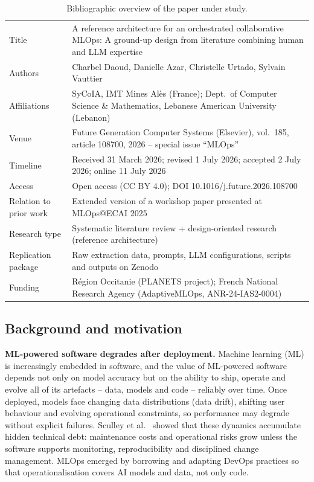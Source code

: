 \documentclass[11pt,a4paper]{article}
\begin{document}
\begin{table}[h]
\centering
\caption{Bibliographic overview of the paper under study.}
\small
\begin{tabularx}{\textwidth}{@{}L{3.2cm}X@{}}
\toprule
Title & A reference architecture for an orchestrated collaborative MLOps: A ground-up design from literature combining human and LLM expertise \\
Authors & Charbel Daoud, Danielle Azar, Christelle Urtado, Sylvain Vauttier \\
Affiliations & SyCoIA, IMT Mines Al\`es (France); Dept.\ of Computer Science \& Mathematics, Lebanese American University (Lebanon) \\
Venue & Future Generation Computer Systems (Elsevier), vol.~185, article 108700, 2026 -- special issue ``MLOps'' \\
Timeline & Received 31 March 2026; revised 1 July 2026; accepted 2 July 2026; online 11 July 2026 \\
Access & Open access (CC BY 4.0); DOI 10.1016/j.future.2026.108700 \\
Relation to prior work & Extended version of a workshop paper presented at MLOps@ECAI 2025~\cite{daoud2025} \\
Research type & Systematic literature review + design-oriented research (reference architecture) \\
Replication package & Raw extraction data, prompts, LLM configurations, scripts and outputs on Zenodo~\cite{zenodo} \\
Funding & R\'egion Occitanie (PLANETS project); French National Research Agency (AdaptiveMLOps, ANR-24-IAS2-0004) \\
\bottomrule
\end{tabularx}
\end{table}

\subsection{Background and motivation}

\textbf{ML-powered software degrades after deployment.}
Machine learning (ML) is increasingly embedded in software, and the value of ML-powered software depends not only on model accuracy but on the ability to ship, operate and evolve all of its artefacts -- data, models and code -- reliably over time. Once deployed, models face changing data distributions (data drift), shifting user behaviour and evolving operational constraints, so performance may degrade without explicit failures. Sculley et al.~\cite{sculley2015} showed that these dynamics accumulate hidden technical debt: maintenance costs and operational risks grow unless the software supports monitoring, reproducibility and disciplined change management. MLOps emerged by borrowing and adapting DevOps practices so that operationalisation covers AI models and data, not only code.
\end{document}
